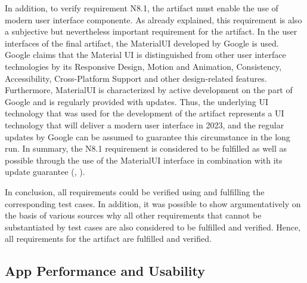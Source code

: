 In addition, to verify requirement N8.1, the artifact must enable the use of modern user interface componente. As already explained, this requirement is also a subjective but nevertheless important requirement for the artifact. In the user interfaces of the final artifact, the MaterialUI developed by Google is used. Google claims that the Material UI is distinguished from other user interface technologies by its Responsive Design, Motion and Animation, Consistency, Accessibility, Cross-Platform Support and other design-related features. Furthermore, MaterialUI is characterized by active development on the part of Google and is regularly provided with updates. Thus, the underlying UI technology that was used for the development of the artifact represents a UI technology that will deliver a modern user interface in 2023, and the regular updates by Google can be assumed to guarantee this circumstance in the long run. In summary, the N8.1 requirement is considered to be fulfilled as well as possible through the use of the MaterialUI interface in combination with its update guarantee (\cite{Google.2023c}, \cite{Google.2023}). 

In conclusion, all requirements could be verified using and fulfilling the corresponding test cases. In addition, it was possible to show argumentatively on the basis of various sources why all other requirements that cannot be substantiated by test cases are also considered to be fulfilled and verified. Hence, all requirements for the artifact are fulfilled and verified.

\subsection{App Performance and Usability}


